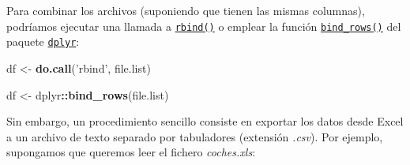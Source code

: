 \documentclass[]{book}
\newenvironment{Shaded}{\begin{snugshade}}{\end{snugshade}}
\newcommand{\CharTok}[1]{\textcolor[rgb]{0.31,0.60,0.02}{#1}}
\newcommand{\CommentTok}[1]{\textcolor[rgb]{0.56,0.35,0.01}{\textit{#1}}}
\newcommand{\ControlFlowTok}[1]{\textcolor[rgb]{0.13,0.29,0.53}{\textbf{#1}}}
\newcommand{\DataTypeTok}[1]{\textcolor[rgb]{0.13,0.29,0.53}{#1}}
\newcommand{\KeywordTok}[1]{\textcolor[rgb]{0.13,0.29,0.53}{\textbf{#1}}}
\newcommand{\NormalTok}[1]{#1}
\newcommand{\OperatorTok}[1]{\textcolor[rgb]{0.81,0.36,0.00}{\textbf{#1}}}
\newcommand{\StringTok}[1]{\textcolor[rgb]{0.31,0.60,0.02}{#1}}
\begin{document}
\begin{Shaded}
\end{Shaded}

Para combinar los archivos (suponiendo que tienen las mismas columnas), podríamos ejecutar una llamada a \href{https://www.rdocumentation.org/packages/base/versions/3.6.1/topics/rbind}{\texttt{rbind()}}
o emplear la función \href{https://www.rdocumentation.org/packages/dplyr/versions/0.7.8/topics/bind}{\texttt{bind\_rows()}}
del paquete \href{https://dplyr.tidyverse.org}{\texttt{dplyr}}:

\begin{Shaded}
\begin{Highlighting}[]
\NormalTok{df <-}\StringTok{ }\KeywordTok{do.call}\NormalTok{(}\StringTok{'rbind'}\NormalTok{, file.list)}

\NormalTok{df <-}\StringTok{ }\NormalTok{dplyr}\OperatorTok{::}\KeywordTok{bind_rows}\NormalTok{(file.list)}
\end{Highlighting}
\end{Shaded}

Sin embargo, un procedimiento sencillo consiste en exportar los datos desde Excel a un archivo
de texto separado por tabuladores (extensión \emph{.csv}).
Por ejemplo, supongamos que queremos leer el fichero \emph{coches.xls}:
\end{document}
